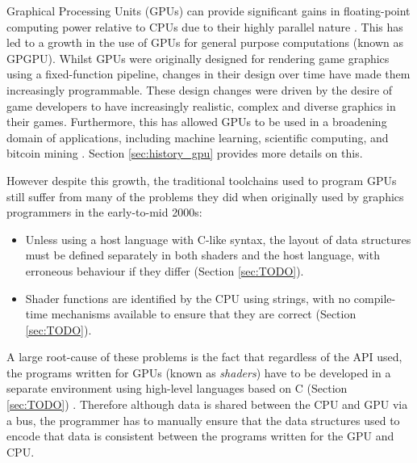 \documentclass[a4paper,12pt,twoside,openright]{report}
\begin{document}

Graphical Processing Units (GPUs) can provide significant gains in
floating-point computing power relative to CPUs due to their highly parallel
nature \cite{CPUGPUOverTime}. This has led to a growth in the use of GPUs for
general purpose computations (known as GPGPU). Whilst GPUs were originally
designed for rendering game graphics using a fixed-function pipeline, changes
in their design over time have made them increasingly programmable. These
design changes were driven by the desire of game developers to have
increasingly realistic, complex and diverse graphics in their games.
Furthermore, this has allowed GPUs to be used in a broadening domain of
applications, including machine learning, scientific computing, and bitcoin
mining \cite{GPUCrypto} \cite{GPUScientificComputing} \cite{GPUAI}. Section
\ref{sec:history_gpu} provides more details on this.


However despite this growth, the traditional toolchains used to program GPUs
still suffer from many of the problems they did when originally used by
graphics programmers in the early-to-mid 2000s:

\begin{itemize}

    \item Unless using a host language with C-like syntax, the layout of data
    structures must be defined separately in both shaders and the host
    language, with erroneous behaviour if they differ (Section \ref{sec:TODO}).

    \item Shader functions are identified by the CPU using strings, with no
    compile-time mechanisms available to ensure that they are correct (Section
    \ref{sec:TODO}).


\end{itemize}

A large root-cause of these problems is the fact that regardless of the API
used, the programs written for GPUs (known as \textit{shaders}) have to be
developed in a separate environment using high-level languages based on C
(Section \ref{sec:TODO}) \cite{TripThroughGraphicsPipeline1}. Therefore
although data is shared between the CPU and GPU via a bus, the programmer has
to manually ensure that the data structures used to encode that data is
consistent between the programs written for the GPU and CPU.
\end{document}
